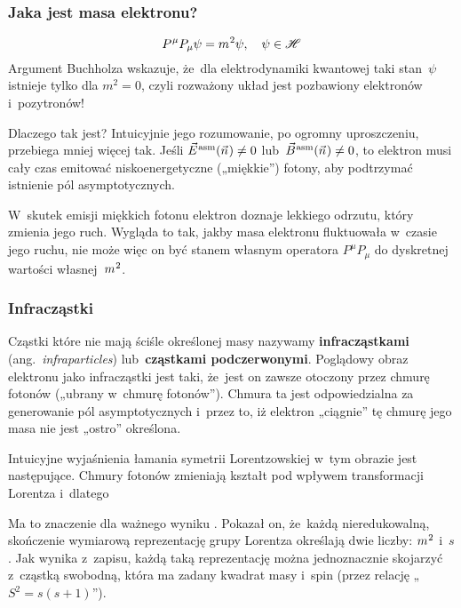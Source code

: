 \documentclass[10pt,t]{beamer}
\begin{document}
\begin{frame}
  \frametitle{Jaka jest masa elektronu?}

  \vspace{-1em}


  \begin{equation}
    \label{eq:Glowne-rodzaje-problemow-podczerwonych-13}
    P^{ \hspace{0.05em} \mu } P_{ \mu } \psi  = m^{ \hspace{0.05em} 2 } \psi, \quad
    \psi \in \mathcal{H}
  \end{equation}
  Argument Buchholza wskazuje, że~dla elektrodynamiki kwantowej taki
  stan~$\psi$ istnieje tylko dla $m^{ 2 } = 0$, czyli rozważony układ jest
  pozbawiony elektronów i~pozytronów!

  Dlaczego tak jest? Intuicyjnie jego rozumowanie, po ogromny uproszczeniu,
  przebiega mniej więcej tak. Jeśli $\vec{E}^{ \hspace{0.05em} \text{asm} }( \vec{n} \hspace{0.05em} ) \neq 0$ lub~$\vec{B}^{ \hspace{0.05em} \text{asm} }( \vec{n} \hspace{0.05em} ) \neq 0$, to
  elektron musi cały czas emitować niskoenergetyczne („miękkie”) fotony,
  aby podtrzymać istnienie pól asymptotycznych.

  W~skutek emisji miękkich fotonu elektron doznaje lekkiego odrzutu, który
  zmienia jego ruch. Wygląda to tak, jakby masa elektronu fluktuowała
  w~czasie jego ruchu, nie może więc on być stanem własnym operatora
  $P^{ \mu } P_{ \mu }$ do dyskretnej wartości własnej~$m^{ \hspace{0.05em} 2 }$.

\end{frame}





\begin{frame}
  \frametitle{Infracząstki}


  Cząstki które nie mają ściśle określonej masy nazywamy
  \textbf{infracząstkami} (ang.~\textit{infraparticles})
  lub~\textbf{cząstkami podczerwonymi}. Poglądowy obraz elektronu jako
  infracząstki jest taki, że~jest on zawsze otoczony przez chmurę fotonów
  („ubrany w~chmurę fotonów”). Chmura ta jest odpowiedzialna za generowanie
  pól asymptotycznych i~przez to, iż elektron „ciągnie” tę chmurę jego masa
  nie jest „ostro” określona.

  Intuicyjne wyjaśnienia łamania symetrii Lorentzowskiej w~tym obrazie
  jest następujące. Chmury fotonów zmieniają kształt pod wpływem
  transformacji Lorentza i~dlatego

  Ma to znaczenie dla ważnego wyniku
  .
  Pokazał on, że~każdą nieredukowalną, skończenie wymiarową reprezentację
  grupy Lorentza określają dwie liczby: $m^{ \hspace{0.05em} 2 }$ i~$s$. Jak
  wynika z~zapisu, każdą taką reprezentację można jednoznacznie skojarzyć
  z~cząstką swobodną, która ma zadany kwadrat masy i~spin (przez relację
  „$S^{ 2 } = s ( s + 1 )$”).

\end{frame}
\end{document}
